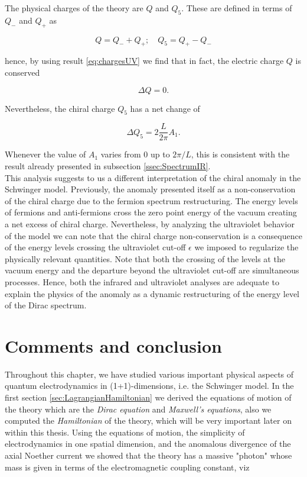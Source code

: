 The physical charges of the theory are $Q$ and $Q_5$. These are defined  in terms of $Q_-$ and $Q_+$ as

\begin{equation}
Q = Q_- + Q_+;\quad Q_5 = Q_+ - Q_-
\end{equation}

hence, by using result \eqref{eq:chargesUV} we find that in fact, the electric charge $Q$ is conserved

\begin{equation}
\Delta Q = 0.
\end{equation}

Nevertheless, the chiral charge $Q_5$ has a net change of

\begin{equation}
\Delta Q_5 = 2\frac{L}{2\pi}A_1.
\end{equation}

Whenever the value of $A_1$ varies from $0$ up to $2\pi/L$, this is consistent with the result already presented in subsection \ref{ssec:SpectrumIR}.\\
 
 This analysis suggests to us a different interpretation of the chiral anomaly in the Schwinger model. Previously, the anomaly presented itself as a non-conservation of the chiral charge due to the fermion spectrum restructuring. The energy levels of fermions and anti-fermions cross the zero point energy of the vacuum creating a net excess of chiral charge. Nevertheless, by analyzing the ultraviolet behavior of the model we can note that the chiral charge non-conservation is a consequence of the energy levels crossing the ultraviolet cut-off $\epsilon$ we imposed to regularize the physically relevant quantities. Note that both the crossing of the levels at the vacuum energy and the departure beyond the ultraviolet cut-off are simultaneous processes. Hence, both the infrared and ultraviolet analyses are adequate to explain the physics of the anomaly as a dynamic restructuring of the energy level of the Dirac spectrum.
 
 
 \section{Comments and conclusion}\label{sec:Conclusion1}
 
  Throughout this chapter, we have studied various important physical aspects of quantum electrodynamics in (1+1)-dimensions, i.e. the Schwinger model. In the first section \ref{sec:LagrangianHamiltonian} we derived the equations of motion of the theory which are the \emph{Dirac equation} and \emph{Maxwell's equations}, also we computed the \emph{Hamiltonian} of the theory, which will be very important later on within this thesis. Using the equations of motion, the simplicity of electrodynamics in one spatial dimension, and the anomalous divergence of the axial Noether current we showed that the theory has a massive "photon" whose mass is given in terms of the electromagnetic coupling constant, viz
 
